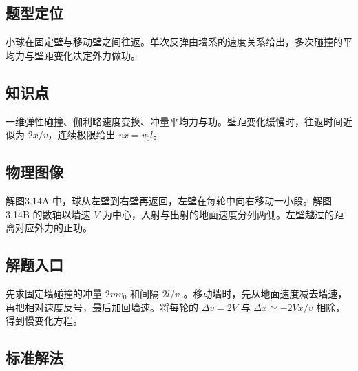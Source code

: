 \documentclass[UTF8,fontset=fandol,a4paper,11pt]{ctexart}
\begin{document}


\subsection*{题型定位}

小球在固定壁与移动壁之间往返。单次反弹由墙系的速度关系给出，多次碰撞的平均力与壁距变化决定外力做功。



\subsection*{知识点}

一维弹性碰撞、伽利略速度变换、冲量平均力与功。壁距变化缓慢时，往返时间近似为 $2x/v$，连续极限给出 $vx=v_0l$。




\subsection*{物理图像}

解图3.14A 中，球从左壁到右壁再返回，左壁在每轮中向右移动一小段。解图3.14B 的数轴以墙速 $V$ 为中心，入射与出射的地面速度分列两侧。左壁越过的距离对应外力的正功。



\subsection*{解题入口}

先求固定墙碰撞的冲量 $2mv_0$ 和间隔 $2l/v_0$。移动墙时，先从地面速度减去墙速，再把相对速度反号，最后加回墙速。将每轮的 $\Delta v=2V$ 与 $\Delta x\simeq-2Vx/v$ 相除，得到慢变化方程。



\subsection*{标准解法}
\end{document}

